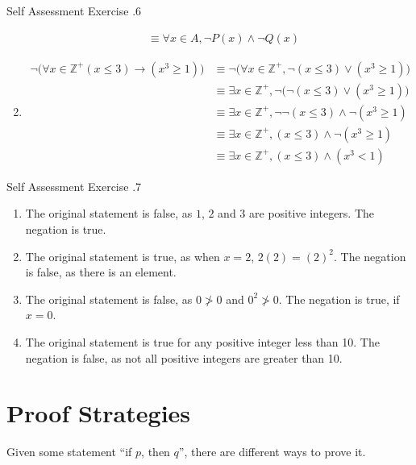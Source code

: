 \documentclass[../notes.tex]{subfiles}
\begin{document}
\begin{exercise}{Self Assessment Exercise \thechapter.6}
\begin{enumerate}[label=(\alph*)]
\begin{align*}
							& \equiv \forall x \in A, \lnot P(x) \land \lnot Q(x)
						\end{align*}
					\item {}
						\begin{align*}
							\lnot \bigl(\forall x \in \mathbb{Z}^{+} (x \leq 3) \rightarrow (x^{3} \geq 1)\bigr) &\equiv \lnot \bigl(\forall x \in \mathbb{Z}^{+}, \lnot (x \leq 3) \lor (x^{3} \geq 1)\bigr)\\
							& \equiv \exists x \in \mathbb{Z}^{+}, \lnot \bigl(\lnot (x \leq 3) \lor (x^{3} \geq 1)\bigr)\\
							& \equiv \exists x \in \mathbb{Z}^{+}, \lnot \lnot (x \leq 3) \land \lnot (x^{3} \geq 1)\\
							& \equiv \exists x \in \mathbb{Z}^{+}, (x \leq 3) \land \lnot (x^{3} \geq 1)\\
							& \equiv \exists x \in \mathbb{Z}^{+}, (x \leq 3) \land (x^{3} < 1)
						\end{align*}
				\end{enumerate}
			\end{exercise}
			\pagebreak
			\begin{exercise}{Self Assessment Exercise \thechapter.7}
				\begin{enumerate}[label=(\alph*)]
					\item The original statement is false, as $1$, $2$ and $3$ are positive integers. The negation is true.
					\item The original statement is true, as when $x = 2$, $2(2) = (2)^{2}$. The negation is false, as there is an element.
					\item The original statement is false, as $0 \not > 0$ and $0^{2} \not > 0$. The negation is true, if $x = 0$.
					\item The original statement is true for any positive integer less than 10. The negation is false, as not all positive integers are greater than 10.
				\end{enumerate}
			\end{exercise}
		\section{Proof Strategies}
				Given some statement ``if $p$, then $q$'', there are different ways to prove it.
\end{document}
